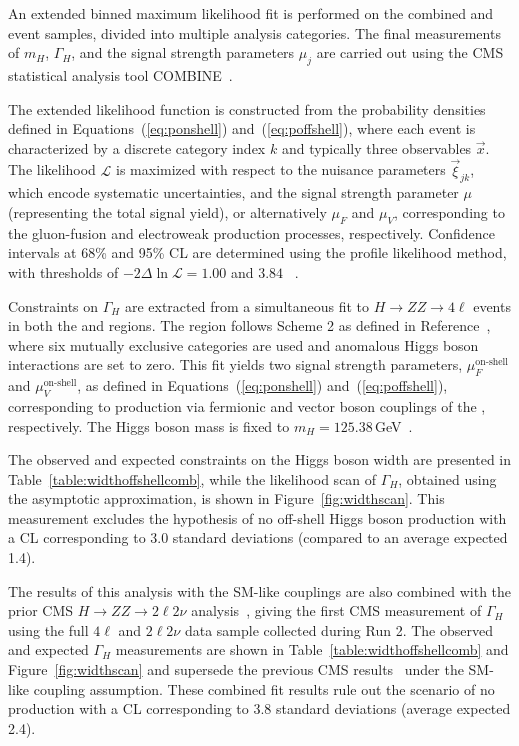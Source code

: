An extended binned maximum likelihood fit is performed on the combined \onshell and \offshell event samples, divided into multiple analysis categories. The final measurements of $m_H$, $\Gamma_H$, and the signal strength parameters $\mu_{j}$ are carried out using the CMS statistical analysis tool COMBINE~\cite{CMS:2024onh}.

The extended likelihood function is constructed from the probability densities defined in Equations~(\ref{eq:ponshell}) and~(\ref{eq:poffshell}), where each event is characterized by a discrete category index $k$ and typically three observables $\vec{x}$. The likelihood $\mathcal{L}$ is maximized with respect to the nuisance parameters $\vec{\xi}_{jk}$, which encode systematic uncertainties, and the signal strength parameter $\mu$ (representing the total signal yield), or alternatively $\mu_F$ and $\mu_V$, corresponding to the gluon-fusion and electroweak production processes, respectively. Confidence intervals at 68\% and 95\% CL are determined using the profile likelihood method, with thresholds of $-2\Delta\ln\mathcal{L} = 1.00$ and $3.84$ ~\cite{Wilks:1938dza}.

Constraints on $\Gamma_H$ are extracted from a simultaneous fit to $H \to ZZ \to 4\ell$ events in both the \onshell and \offshell regions. The \onshell region follows Scheme 2 as defined in Reference~\cite{CMS:2021nnc}, where six mutually exclusive categories are used and anomalous Higgs boson interactions are set to zero. This fit yields two signal strength parameters, $\mu^\text{on-shell}_{F}$ and $\mu^\text{on-shell}_{V}$, as defined in Equations~(\ref{eq:ponshell}) and~(\ref{eq:poffshell}), corresponding to production via fermionic and vector boson couplings of the \Hboson, respectively. The Higgs boson mass is fixed to $m_H = 125.38$\,GeV~\cite{Sirunyan:2020xwk}.

The observed and expected constraints on the Higgs boson width are presented in Table~\ref{table:widthoffshellcomb}, while the likelihood scan of $\Gamma_H$, obtained using the asymptotic approximation, is shown in Figure~\ref{fig:widthscan}. This measurement excludes the hypothesis of no off-shell Higgs boson production with a CL corresponding to 3.0 standard deviations (compared to an average expected 1.4).

The results of this analysis with the SM-like couplings are also combined with the prior CMS \offshell $H\to ZZ\to2\ell2\nu$ analysis~\cite{CMS:2022ley}, giving the first CMS measurement of $\Gamma_H$ using the full $4\ell$ and $2\ell2\nu$ data sample collected during Run 2. 
The observed and expected $\Gamma_H$ measurements are shown in Table~\ref{table:widthoffshellcomb} and Figure~\ref{fig:widthscan} and supersede the previous CMS results~\cite{CMS:2022ley} under the SM-like coupling assumption. These combined fit results rule out the scenario of no \offshell \Hboson production
with a CL corresponding to 3.8 standard deviations (average expected 2.4).

